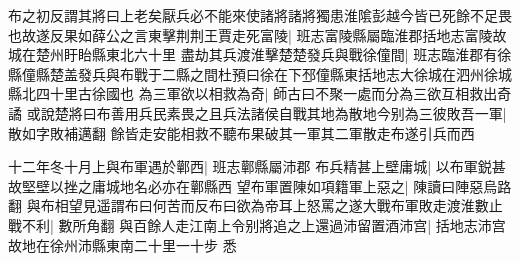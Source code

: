 布之初反謂其將曰上老矣厭兵必不能來使諸將諸將獨患淮隂彭越今皆已死餘不足畏也故遂反果如薛公之言東擊荆荆王賈走死富陵|{
	班志富陵縣屬臨淮郡括地志富陵故城在楚州盱眙縣東北六十里}
盡劫其兵渡淮擊楚楚發兵與戰徐僮間|{
	班志臨淮郡有徐縣僮縣楚盖發兵與布戰于二縣之間杜預曰徐在下邳僮縣東括地志大徐城在泗州徐城縣北四十里古徐國也}
為三軍欲以相救為奇|{
	師古曰不聚一處而分為三欲互相救出奇譎}
或說楚將曰布善用兵民素畏之且兵法諸侯自戰其地為散地今别為三彼敗吾一軍|{
	散如字敗補邁翻}
餘皆走安能相救不聽布果破其一軍其二軍散走布遂引兵而西

十二年冬十月上與布軍遇於鄿西|{
	班志鄿縣屬沛郡}
布兵精甚上壁庸城|{
	以布軍鋭甚故堅壁以挫之庸城地名必亦在鄿縣西}
望布軍置陳如項籍軍上惡之|{
	陳讀曰陣惡烏路翻}
與布相望見遥謂布曰何苦而反布曰欲為帝耳上怒罵之遂大戰布軍敗走渡淮數止戰不利|{
	數所角翻}
與百餘人走江南上令别將追之上還過沛留置酒沛宫|{
	括地志沛宫故地在徐州沛縣東南二十里一十步}
悉

